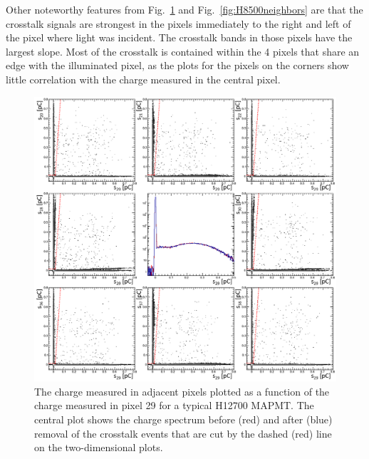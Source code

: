 Other noteworthy features from Fig.~\ref{fig:H12700neighbors} and Fig.~\ref{fig:H8500neighbors} are that the crosstalk signals are strongest in the pixels immediately to the right and left of the pixel where light was incident. The crosstalk bands in those pixels have the largest slope. Most of the crosstalk is contained within the 4 pixels that share an edge with the illuminated pixel, as the plots for the pixels on the corners show little correlation with the charge measured in the central pixel.

\begin{figure}[h!bt]
	\centering
	\includegraphics[width=0.9\linewidth]{figures/H12700_ct_updated.png}
	\caption{The charge measured in adjacent pixels plotted as a function of the charge measured in pixel 29 for a typical H12700 MAPMT. The central plot shows the charge spectrum before (red) and after (blue) removal of the crosstalk events that are cut by the dashed (red) line on the two-dimensional plots.}
	\label{fig:H12700neighbors}
\end{figure}
